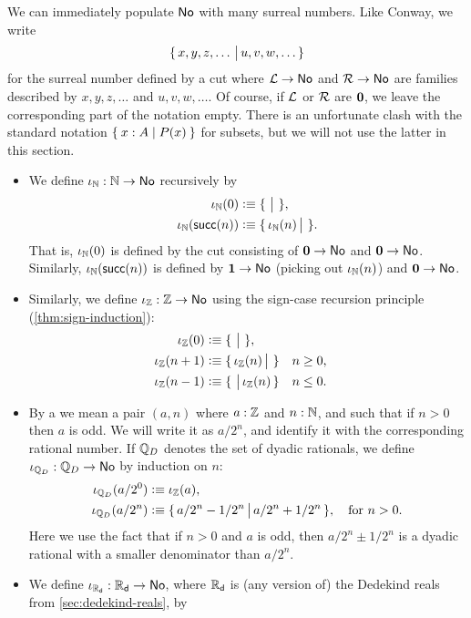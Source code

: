 We can immediately populate $\mathsf{No}$ with many surreal numbers.
Like Conway, we write
\[\{\,x,y,z,\dots\,\big|\,u,v,w,\dots\,\}\]
for the surreal number defined by a cut where $\mathcal{L}\to\mathsf{No}$ and $\mathcal{R}\to\mathsf{No}$ are families described by $x,y,z,\dots$ and $u,v,w,\dots$.
Of course, if $\mathcal{L}$ or $\mathcal{R}$ are $\mathbf{0}$, we leave the corresponding part of the notation empty.
There is an unfortunate clash with the standard notation $\Set{x:A | P(x)}$ for subsets, but we will not use the latter in this section.
\begin{itemize}
\item We define $\iota_{\mathbb{N}}:\mathbb{N}\to\mathsf{No}$ recursively by
  \begin{align*}
    \iota_{\mathbb{N}}(0) &\vcentcolon\equiv \{\,\,\big|\,\,\},\\
    \iota_\mathbb{N}(\mathsf{succ}(n)) &\vcentcolon\equiv \{\,\iota_\mathbb{N}(n)\,\big|\,\,\}.
  \end{align*}
  That is, $\iota_\mathbb{N}(0)$ is defined by the cut consisting of $\mathbf{0}\to\mathsf{No}$ and $\mathbf{0}\to\mathsf{No}$.
  Similarly, $\iota_\mathbb{N}(\mathsf{succ}(n))$ is defined by $\mathbf{1}\to\mathsf{No}$ (picking out $\iota_\mathbb{N}(n)$) and $\mathbf{0}\to\mathsf{No}$.
\item Similarly, we define $\iota_{\mathbb{Z}}:\mathbb{Z}\to\mathsf{No}$ using the sign-case recursion principle (\autoref{thm:sign-induction}):
  \begin{align*}
    \iota_{\mathbb{Z}}(0) &\vcentcolon\equiv \{\,\,\big|\,\,\},\\
    \iota_\mathbb{Z}(n+1) &\vcentcolon\equiv \{\,\iota_\mathbb{Z}(n)\,\big|\,\,\} & &\text{$n\ge 0$,}\\
    \iota_\mathbb{Z}(n-1) &\vcentcolon\equiv \{\,\,\big|\,\iota_\mathbb{Z}(n)\,\} & &\text{$n\le 0$.}
  \end{align*}
\item By a 
  we mean a pair $(a,n)$ where $a:\mathbb{Z}$ and $n:\mathbb{N}$, and such that if $n>0$ then $a$ is odd.
  We will write it as $a/2^n$, and identify it with the corresponding rational number.
  If $\mathbb{Q}_D$ denotes the set of dyadic rationals, we define $\iota_{\mathbb{Q}_D}:\mathbb{Q}_D\to\mathsf{No}$ by induction on $n$:
  \begin{align*}
    \iota_{\mathbb{Q}_D}(a/2^0) &\vcentcolon\equiv \iota_\mathbb{Z}(a),\\
    \iota_{\mathbb{Q}_D}(a/2^n) &\vcentcolon\equiv \{\,a/2^n - 1/2^n\,\big|\,a/2^n + 1/2^n\,\},
    \quad \text{for $n>0$.}
  \end{align*}
  Here we use the fact that if $n>0$ and $a$ is odd, then $a/2^n \pm 1/2^n$ is a dyadic rational with a smaller denominator than $a/2^n$.
\item We define $\iota_{\mathbb{R}_\mathsf{d}}:\mathbb{R}_\mathsf{d}\to\mathsf{No}$, where $\mathbb{R}_\mathsf{d}$ is (any version of) the Dedekind reals from \autoref{sec:dedekind-reals}, by

\end{itemize}
